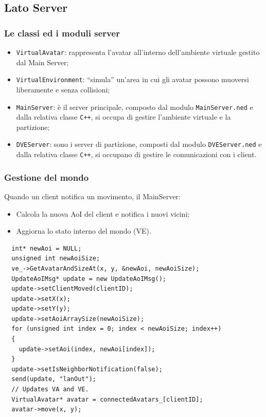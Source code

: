 \subsection*{Lato Server}

\begin{frame}
\frametitle{Le classi ed i moduli server}
\begin{itemize}[<+->]
\item
\alert{\texttt{VirtualAvatar}}:
rappresenta l'avatar all'interno
dell'ambiente virtuale gestito dal Main Server;
\item
\alert{\texttt{VirtualEnvironment}}:
``simula'' un'area in cui gli avatar possono muoversi liberamente e
senza collisioni;
\item
\alert{\texttt{MainServer}}:
è il server principale, composto dal modulo \texttt{MainServer.ned} e dalla
relativa classe \texttt{C++}, si occupa di gestire l'ambiente virtuale e la
partizione;
\item
\alert{\texttt{DVEServer}}:
sono i server di partizione, composti dal modulo \texttt{DVEServer.ned} e dalla
relativa classe \texttt{C++},
si occupano di gestire le comunicazioni con i client.
\end{itemize}
\end{frame}

\begin{frame}[fragile]
\frametitle{Gestione del mondo}
\begin{block}{Quando un client notifica un movimento, il MainServer:}
\begin{itemize}
\item
Calcola la nuova AoI del client e notifica i nuovi vicini;
\item
Aggiorna lo stato interno del mondo (VE).
\end{itemize}
\end{block}

\begin{lstlisting}
  int* newAoi = NULL;
  unsigned int newAoiSize;
  ve_->GetAvatarAndSizeAt(x, y, &newAoi, newAoiSize);
  UpdateAoIMsg* update = new UpdateAoIMsg();
  update->setClientMoved(clientID);
  update->setX(x);
  update->setY(y);
  update->setAoiArraySize(newAoiSize);
  for (unsigned int index = 0; index < newAoiSize; index++)
  {
    update->setAoi(index, newAoi[index]);
  }
  update->setIsNeighborNotification(false);
  send(update, "lanOut");
  // Updates VA and VE.
  VirtualAvatar* avatar = connectedAvatars_[clientID];
  avatar->move(x, y);
\end{lstlisting}
\end{frame}

